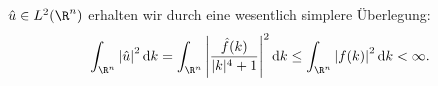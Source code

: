 \begin{solution}
\begin{itemize}
    $\hat u \in L^2(\R^n)$ erhalten wir durch eine wesentlich simplere Überlegung:
    \begin{align*}
        \int_{\R^n} \left| \hat u \right|^2 \mathrm{d}k = \int_{\R^n} \left| \frac{\hat f(k)}{|k|^4 + 1} \right|^2 \mathrm{d}k \leq \int_{\R^n} \left| f(k) \right|^2 \mathrm{d}k < \infty.
    \end{align*}
\end{itemize}

\end{solution}

